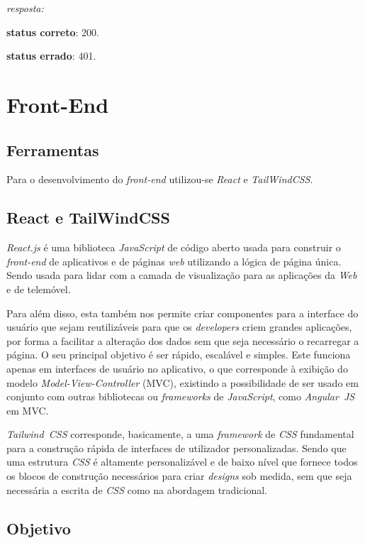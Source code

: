 \documentclass[11pt,a4paper]{report}
\begin{document}
\emph{resposta:}

\textbf{status correto}: 200.

\textbf{status errado}: 401.

\newpage

\chapter{Front-End}

\section{Ferramentas}
Para o desenvolvimento do  \emph{front-end} utilizou-se \emph{React} e \emph{TailWindCSS}.

\section{React e TailWindCSS}

\emph{React.js} é uma biblioteca \emph{JavaScript} de código aberto usada para construir o \emph{front-end} de aplicativos e de páginas \emph{web} utilizando a lógica de página única. Sendo usada para lidar com a camada de visualização para as aplicações da \emph{Web} e de telemóvel. 

Para além disso, esta também nos permite criar componentes para a interface do usuário que sejam reutilizáveis para que os \emph{developers} criem grandes aplicações, por forma a facilitar a alteração dos dados sem que seja necessário o recarregar a página. O seu principal objetivo é ser rápido, escalável e simples. Este funciona apenas em interfaces de usuário no aplicativo, o que corresponde à exibição do modelo \emph{Model-View-Controller} (MVC), existindo a possibilidade de ser usado em conjunto com outras bibliotecas ou \emph{frameworks} de \emph{JavaScript}, como \emph{Angular\ JS} em MVC.

\emph{Tailwind\ CSS} corresponde, basicamente, a uma \emph{framework} de \emph{CSS} fundamental para a construção rápida de interfaces de utilizador personalizadas. Sendo que uma estrutura \emph{CSS} é altamente personalizável e de baixo nível que fornece todos os blocos de construção necessários para criar \emph{designs} sob medida, sem que seja necessária a escrita de \emph{CSS} como na abordagem tradicional.

\section{Objetivo}
\end{document}
